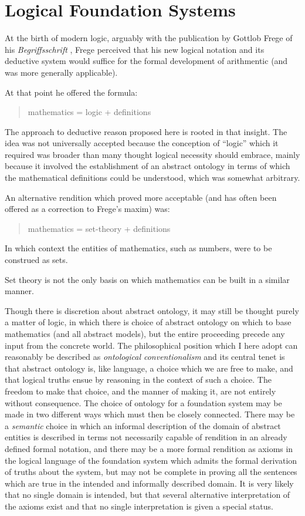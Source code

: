 \documentclass[10pt,titlepage]{article}
\begin{document}
\section{Logical Foundation Systems}

At the birth of modern logic, arguably with the publication by Gottlob Frege of his \emph{Begriffsschrift} \cite{frege1879}, Frege perceived that his new logical notation and its deductive system would suffice for the formal development of arithmentic (and was more generally applicable).

At that point he offered the formula:

\begin{quote}
  mathematics = logic + definitions
\end{quote}

The approach to deductive reason proposed here is rooted in that insight.
The idea was not universally accepted because the conception of ``logic'' which it required was broader than many thought logical necessity should embrace, mainly because it involved the establishment of an abstract ontology in terms of which the mathematical definitions could be understood, which was somewhat arbitrary.

An alternative rendition which proved more acceptable (and has often been offered as a correction to Frege's maxim) was:

\begin{quote}
  mathematics = set-theory + definitions
\end{quote}

In which context the entities of mathematics, such as numbers, were to be construed as sets.

Set theory is not the only basis on which mathematics can be built in a similar manner.

Though there is discretion about abstract ontology, it may still be thought purely a matter of logic, in which there is choice of abstract ontology on which to base mathematics (and all abstract models), but the entire proceeding precede any input from the concrete world.
The philosophical position which I here adopt can reasonably be described as \emph{ontological conventionalism} and its central tenet is that abstract ontology is, like language, a choice which we are free to make, and that logical truths ensue by reasoning in the context of such a choice.
The freedom to make that choice, and the manner of making it, are not entirely without consequence.
The choice of ontology for a foundation system may be made in two different ways which must then be closely connected.
There may be a \emph{semantic} choice in which an informal description of the domain of abstract entities is described in terms not necessarily capable of rendition in an already defined formal notation, and there may be a more formal rendition as axioms in the logical language of the foundation system which admits the formal derivation of truths about the system, but may not be complete in proving all the sentences which are true in the intended and informally described domain.
It is very likely that no single domain is intended, but that several alternative interpretation of the axioms exist and that no single interpretation is given a special status.
\end{document}
